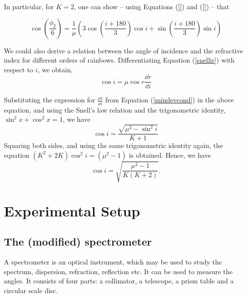 In particular, for $K = 2$, one can show -- using Equations (\ref{}) and (\ref{}) -- that 

\begin{equation}
   \cos\left( \frac{\phi_2}{6}\right) = \frac{1}{\mu}\left( 3 \cos\left(\frac{i + 180}{3}\right) \cos{i} + \sin\left(\frac{i + 180}{3}\right)\sin{i} \right)
\end{equation}


We could also derive a relation between the angle of incidence and the refractive index for different orders of rainbows. Differentiating Equation (\ref{snellir}) with respect to $i$, we obtain,
 \begin{equation*}
     \cos i = \mu\cos r \frac{\dd r}{\dd i}
\end{equation*}

Substituting the expression for $\frac{\dd r}{\dd i}$ from Equation (\ref{mindevcond}) in the above equation, and using the Snell's law relation and the trigonometric identity, $\sin^2 x + \cos^2 x = 1$, we have
\begin{equation}
\cos i=\frac{\sqrt{\mu^{2}-\sin^{2}i}}{K+1}
\end{equation}
Squaring both sides, and using the same trigonometric identity again, the equation $(K^2 + 2K)\cos^2 i = (\mu^2 - 1)$ is obtained.
Hence, we have
\begin{equation}
    \cos i = \sqrt{\frac{\mu^2 - 1}{K(K+2)}}.
    \label{iK}
\end{equation}
 
 
 
 
\section*{Experimental Setup}

\subsection*{The (modified) spectrometer}

A spectrometer is an optical instrument, which may be used to study the spectrum, dispersion, refraction, reflection etc. It can be used to measure the angles. It consists of four parts: a collimator, a telescope, a prism table and a circular scale disc.

